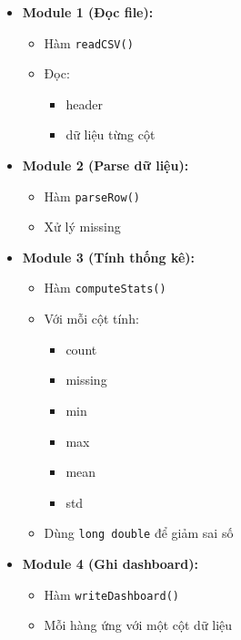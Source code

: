 \begin{itemize}
\begin{itemize}
        \item \textbf{Module 1 (Đọc file):}

        \begin{itemize}
            \item Hàm \texttt{readCSV()}
            \item Đọc:
            \begin{itemize}
                \item header
                \item dữ liệu từng cột
            \end{itemize}
        \end{itemize}

        \item \textbf{Module 2 (Parse dữ liệu):}

        \begin{itemize}
            \item Hàm \texttt{parseRow()}
            \item Xử lý missing
        \end{itemize}

        \item \textbf{Module 3 (Tính thống kê):}

        \begin{itemize}
            \item Hàm \texttt{computeStats()}
            \item Với mỗi cột tính:
            \begin{itemize}
                \item count
                \item missing
                \item min
                \item max
                \item mean
                \item std
            \end{itemize}

            \item Dùng \texttt{long double}
            để giảm sai số
        \end{itemize}

        \item \textbf{Module 4 (Ghi dashboard):}

        \begin{itemize}
            \item Hàm \texttt{writeDashboard()}
            \item Mỗi hàng ứng với một cột dữ liệu
        \end{itemize}


\end{itemize}
\end{itemize}

